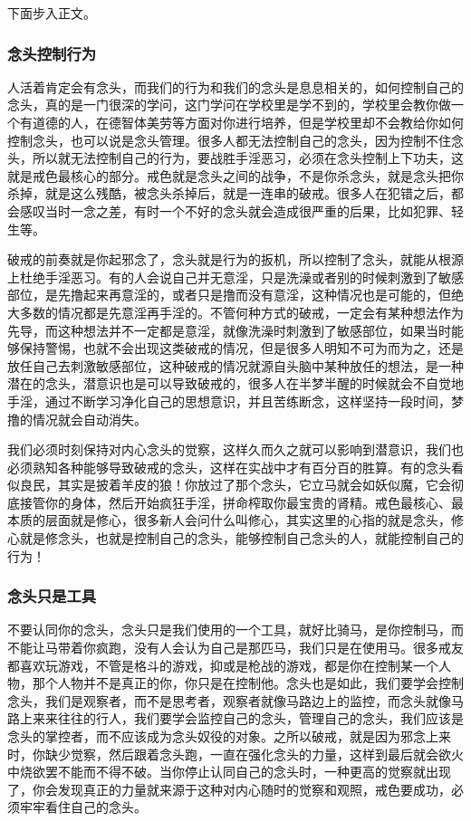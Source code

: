 下面步入正文。

\subsubsection{念头控制行为}

人活着肯定会有念头，而我们的行为和我们的念头是息息相关的，如何控制自己的念头，真的是一门很深的学问，这门学问在学校里是学不到的，学校里会教你做一个有道德的人，在德智体美劳等方面对你进行培养，但是学校里却不会教给你如何控制念头，也可以说是念头管理。很多人都无法控制自己的念头，因为控制不住念头，所以就无法控制自己的行为，要战胜手淫恶习，必须在念头控制上下功夫，这就是戒色最核心的部分。戒色就是念头之间的战争，不是你杀念头，就是念头把你杀掉，就是这么残酷，被念头杀掉后，就是一连串的破戒。很多人在犯错之后，都会感叹当时一念之差，有时一个不好的念头就会造成很严重的后果，比如犯罪、轻生等。

破戒的前奏就是你起邪念了，念头就是行为的扳机，所以控制了念头，就能从根源上杜绝手淫恶习。有的人会说自己并无意淫，只是洗澡或者别的时候刺激到了敏感部位，是先撸起来再意淫的，或者只是撸而没有意淫，这种情况也是可能的，但绝大多数的情况都是先意淫再手淫的。不管何种方式的破戒，一定会有某种想法作为先导，而这种想法并不一定都是意淫，就像洗澡时刺激到了敏感部位，如果当时能够保持警惕，也就不会出现这类破戒的情况，但是很多人明知不可为而为之，还是放任自己去刺激敏感部位，这种破戒的情况就源自头脑中某种放任的想法，是一种潜在的念头，潜意识也是可以导致破戒的，很多人在半梦半醒的时候就会不自觉地手淫，通过不断学习净化自己的思想意识，并且苦练断念，这样坚持一段时间，梦撸的情况就会自动消失。

我们必须时刻保持对内心念头的觉察，这样久而久之就可以影响到潜意识，我们也必须熟知各种能够导致破戒的念头，这样在实战中才有百分百的胜算。有的念头看似良民，其实是披着羊皮的狼！你放过了那个念头，它立马就会如妖似魔，它会彻底接管你的身体，然后开始疯狂手淫，拼命榨取你最宝贵的肾精。戒色最核心、最本质的层面就是修心，很多新人会问什么叫修心，其实这里的心指的就是念头，修心就是修念头，也就是控制自己的念头，能够控制自己念头的人，就能控制自己的行为！

\subsubsection{念头只是工具}

不要认同你的念头，念头只是我们使用的一个工具，就好比骑马，是你控制马，而不能让马带着你疯跑，没有人会认为自己是那匹马，我们只是在使用马。很多戒友都喜欢玩游戏，不管是格斗的游戏，抑或是枪战的游戏，都是你在控制某一个人物，那个人物并不是真正的你，你只是在控制他。念头也是如此，我们要学会控制念头，我们是观察者，而不是思考者，观察者就像马路边上的监控，而念头就像马路上来来往往的行人，我们要学会监控自己的念头，管理自己的念头，我们应该是念头的掌控者，而不应该成为念头奴役的对象。之所以破戒，就是因为邪念上来时，你缺少觉察，然后跟着念头跑，一直在强化念头的力量，这样到最后就会欲火中烧欲罢不能而不得不破。当你停止认同自己的念头时，一种更高的觉察就出现了，你会发现真正的力量就来源于这种对内心随时的觉察和观照，戒色要成功，必须牢牢看住自己的念头。

